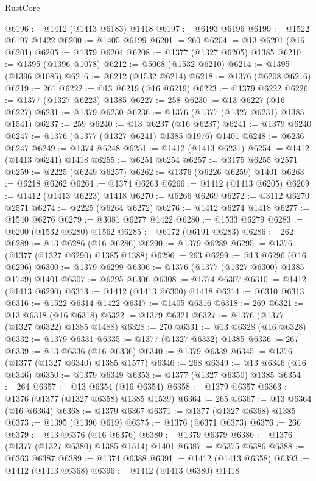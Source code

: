 \begin{lexlean}{RustCore}
\begin{coremodule}
@6196 := @1412 (@1413 @6183) @1418
@6197 := @6193 @6196
@6199 := @1522 @6197 @1422
@6200 := @1405 @6199
@6201 := 260
@6204 := @13 @6201 (@16 @6201)
@6205 := @1379 @6204
@6208 := @1377 (@1327 @6205) @1385
@6210 := @1395 (@1396 @1078)
@6212 := @5068 (@1532 @6210)
@6214 := @1395 (@1396 @1085)
@6216 := @6212 (@1532 @6214)
@6218 := @1376 (@6208 @6216)
@6219 := 261
@6222 := @13 @6219 (@16 @6219)
@6223 := @1379 @6222
@6226 := @1377 (@1327 @6223) @1385
@6227 := 258
@6230 := @13 @6227 (@16 @6227)
@6231 := @1379 @6230
@6236 := @1376 (@1377 (@1327 @6231) @1385 @1541)
@6237 := 259
@6240 := @13 @6237 (@16 @6237)
@6241 := @1379 @6240
@6247 := @1376 (@1377 (@1327 @6241) @1385 @1976) @1401
@6248 := @6236 @6247
@6249 := @1374 @6248
@6251 := @1412 (@1413 @6231)
@6254 := @1412 (@1413 @6241) @1418
@6255 := @6251 @6254
@6257 := @3175 @6255 @2571
@6259 := @2225 (@6249 @6257)
@6262 := @1376 (@6226 @6259) @1401
@6263 := @6218 @6262
@6264 := @1374 @6263
@6266 := @1412 (@1413 @6205)
@6269 := @1412 (@1413 @6223) @1418
@6270 := @6266 @6269
@6272 := @3112 @6270 @2571
@6274 := @2225 (@6264 @6272)
@6276 := @1412 @6274 @1418
@6277 := @1540 @6276
@6279 := @3081 @6277 @1422
@6280 := @1533 @6279
@6283 := @6200 (@1532 @6280) @1562
@6285 := @6172 (@6191 @6283)
@6286 := 262
@6289 := @13 @6286 (@16 @6286)
@6290 := @1379 @6289
@6295 := @1376 (@1377 (@1327 @6290) @1385 @1388)
@6296 := 263
@6299 := @13 @6296 (@16 @6296)
@6300 := @1379 @6299
@6306 := @1376 (@1377 (@1327 @6300) @1385 @1749) @1401
@6307 := @6295 @6306
@6308 := @1374 @6307
@6310 := @1412 (@1413 @6290)
@6313 := @1412 (@1413 @6300) @1418
@6314 := @6310 @6313
@6316 := @1522 @6314 @1422
@6317 := @1405 @6316
@6318 := 269
@6321 := @13 @6318 (@16 @6318)
@6322 := @1379 @6321
@6327 := @1376 (@1377 (@1327 @6322) @1385 @1488)
@6328 := 270
@6331 := @13 @6328 (@16 @6328)
@6332 := @1379 @6331
@6335 := @1377 (@1327 @6332) @1385
@6336 := 267
@6339 := @13 @6336 (@16 @6336)
@6340 := @1379 @6339
@6345 := @1376 (@1377 (@1327 @6340) @1385 @1577)
@6346 := 268
@6349 := @13 @6346 (@16 @6346)
@6350 := @1379 @6349
@6353 := @1377 (@1327 @6350) @1385
@6354 := 264
@6357 := @13 @6354 (@16 @6354)
@6358 := @1379 @6357
@6363 := @1376 (@1377 (@1327 @6358) @1385 @1539)
@6364 := 265
@6367 := @13 @6364 (@16 @6364)
@6368 := @1379 @6367
@6371 := @1377 (@1327 @6368) @1385
@6373 := @1395 (@1396 @619)
@6375 := @1376 (@6371 @6373)
@6376 := 266
@6379 := @13 @6376 (@16 @6376)
@6380 := @1379 @6379
@6386 := @1376 (@1377 (@1327 @6380) @1385 @1514) @1401
@6387 := @6375 @6386
@6388 := @6363 @6387
@6389 := @1374 @6388
@6391 := @1412 (@1413 @6358)
@6393 := @1412 (@1413 @6368)
@6396 := @1412 (@1413 @6380) @1418

\end{coremodule}
\end{lexlean}
